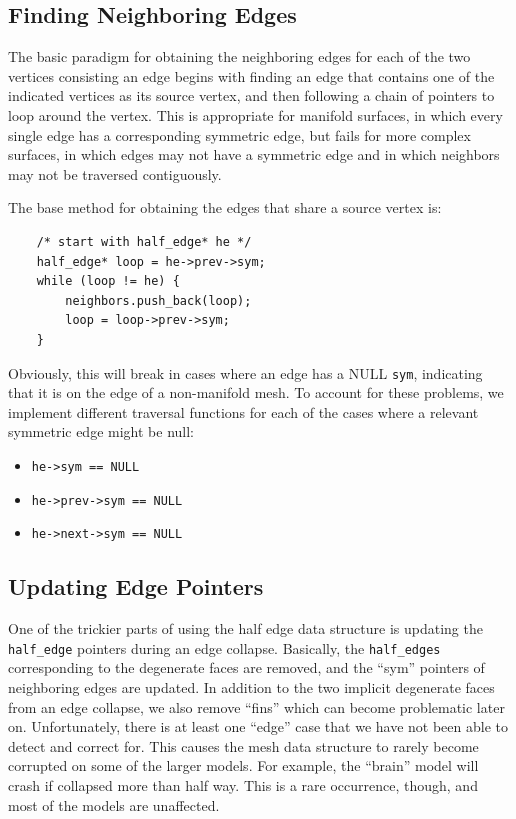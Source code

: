 \documentclass[11pt]{article}
\begin{document}
\subsection{Finding Neighboring Edges}

The basic paradigm for obtaining the neighboring edges for each of the two
vertices consisting an edge begins with finding an edge that contains one of
the indicated vertices as its source vertex, and then following a chain of
pointers to loop around the vertex. This is appropriate for manifold surfaces,
in which every single edge has a corresponding symmetric edge, but fails for
more complex surfaces, in which edges may not have a symmetric edge and in
which neighbors may not be traversed contiguously.

The base method for obtaining the edges that share a source vertex is:

\begin{verbatim}
    /* start with half_edge* he */
    half_edge* loop = he->prev->sym;
    while (loop != he) {
        neighbors.push_back(loop);
        loop = loop->prev->sym;
    }
\end{verbatim}

Obviously, this will break in cases where an edge has a NULL \verb`sym`,
indicating that it is on the edge of a non-manifold mesh. To account for these
problems, we implement different traversal functions for each of the cases where a
relevant symmetric edge might be null:

\begin{itemize}
    \item \verb`he->sym == NULL`
    \item \verb`he->prev->sym == NULL`
    \item \verb`he->next->sym == NULL`
\end{itemize}

\subsection{Updating Edge Pointers}
One of the trickier parts of using the half edge data structure is updating the \verb`half_edge` pointers during an edge collapse. Basically, the \verb`half_edges` corresponding to the degenerate faces are removed, and the ``sym'' pointers of neighboring edges are updated. In addition to the two implicit degenerate faces from an edge collapse, we also remove ``fins'' which can become problematic later on. Unfortunately, there is at least one ``edge'' case that we have not been able to detect and correct for. This causes the mesh data structure to rarely become corrupted on some of the larger models. For example, the ``brain'' model will crash if collapsed more than half way. This is a rare occurrence, though, and most of the models are unaffected.
\end{document}
